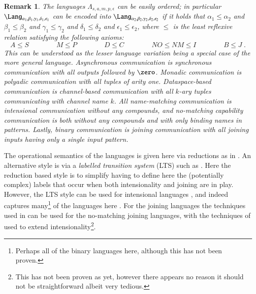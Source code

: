 \documentclass[submission,copyright,creativecommons]{eptcs}
\newtheorem{remark}[theorem]{Remark}
\begin{document}
\begin{remark}
\label{rem:leq}
The languages $\Lambda_{s,a,m,p,\epsilon}$ can be easily ordered; in particular
$\Lang_{\alpha_1,\beta_1,\gamma_1,\delta_1,\epsilon_1}$ can be encoded into
$\Lang_{\alpha_2,\beta_2,\gamma_2,\delta_2,\epsilon_2}$ if it holds that
$\alpha_1\leq\alpha_2$ and
$\beta_1\leq\beta_2$ and
$\gamma_1\leq\gamma_2$ and
$\delta_1\leq\delta_2$ and
$\epsilon_1\leq \epsilon_2$, where $\leq$ is the least reflexive relation satisfying the following axioms:
\begin{equation*}
A \leq S\qquad\qquad M\leq P\qquad\qquad D\leq C\qquad\qquad
\mathit{NO}\leq \mathit{NM}\leq I \qquad\qquad B\leq J\; .
\end{equation*}
This can be understood as the lesser language variation being a special case of the more general language.
Asynchronous communication is synchronous communication with all outputs followed by $\zero$.
Monadic communication is polyadic communication with all tuples of arity one.
Dataspace-based communication is channel-based communication with all $k$-ary tuples communicating with channel name $k$.
All name-matching communication is intensional communication without any compounds,
and no-matching capability communication is both without any compounds and with only binding names
in patterns.
Lastly, binary communication is joining communication with all joining inputs having only a single input pattern.
\end{remark}


The operational semantics of the languages is given here via reductions as in
\cite{milner:polyadic-tutorial,Honda95onreduction-based,givenwilson:hal-01026301}.
An alternative style is via a {\em labelled transition system} (LTS) such as \cite{G:IC08}.
Here the reduction based style is to simplify having to define here the (potentially complex)
labels that occur when both intensionality and joining are in play. However, the LTS style can be
used for intensional languages \cite{BJPV11,GivenWilsonPHD,GivenWilsonGorla13}, and indeed
captures many\footnote
{Perhaps all of the binary languages here, although this has not been proven.}
of the languages here \cite{GivenWilsonGorla13}.
For the joining languages the techniques used in \cite{Fournet99bisimulationsin} can be used for
the no-matching joining languages, with the techniques of \cite{GivenWilsonGorla13} used to extend
intensionality\footnote{This has not been proven as yet, however there appears no reason it should not be
straightforward albeit very tedious.}.
\end{document}
